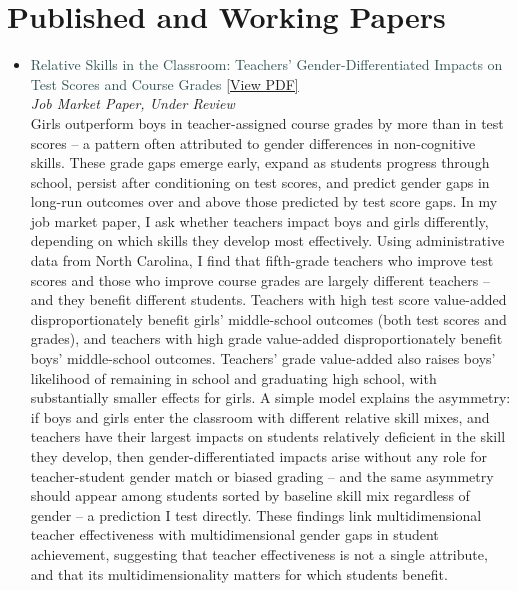 \documentclass[letter,10pt]{article}
\begin{document}
\section*{Published and Working Papers}
\begin{itemize}
    \item[] \textcolor{darkslategray}{Relative Skills in the Classroom: Teachers' Gender-Differentiated Impacts on Test Scores and Course Grades} \href{https://gagandeep-sachdeva.com/JMP%20Sachdeva.pdf}{[View PDF]} \\
    {\small{\textit{Job Market Paper, Under Review}}}\\
    Girls outperform boys in teacher-assigned course grades by more than in test scores -- a  pattern often attributed to gender differences in non-cognitive skills. These grade gaps emerge early, expand as students progress through school, persist after conditioning on test scores, and predict gender gaps in long-run outcomes over and above those predicted by test score gaps. In my job market paper, I ask whether teachers impact boys and girls differently, depending on which skills they develop most effectively. Using administrative data from North Carolina, I find that fifth-grade teachers who improve test scores and those who improve course grades are largely different teachers -- and they benefit different students. Teachers with high test score value-added disproportionately benefit girls’ middle-school outcomes (both test scores and grades), and teachers with high grade value-added disproportionately benefit boys’ middle-school outcomes. Teachers’ grade value-added also raises boys' likelihood of remaining in school and graduating high school, with substantially smaller effects for girls. A simple model explains the asymmetry: if boys and girls enter the classroom with different relative skill mixes, and teachers have their largest impacts on students relatively deficient in the skill they develop, then gender-differentiated impacts arise without any role for teacher-student gender match or biased grading -- and the same asymmetry should appear among students sorted by baseline skill mix regardless of gender -- a prediction I test directly. These findings link multidimensional teacher effectiveness with multidimensional gender gaps in student achievement, suggesting that teacher effectiveness is not a single attribute, and that its multidimensionality matters for which students benefit.


\end{itemize}
\end{document}
